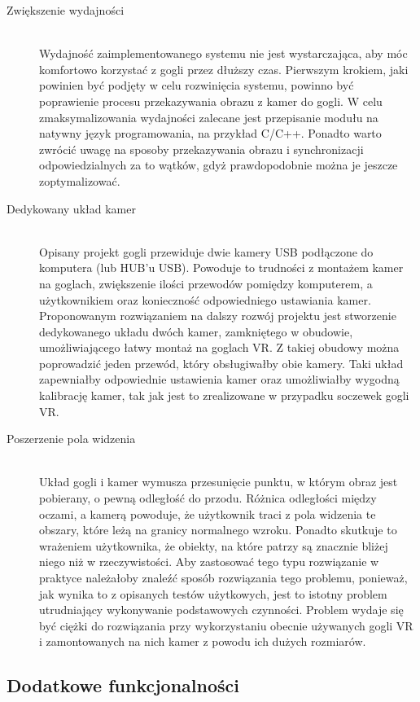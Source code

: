 \documentclass[a4paper,11pt,twoside]{report}
\theoremstyle{definition}
\begin{document}
\begin{description}
\item [Zwiększenie wydajności] \hfill \\
Wydajność zaimplementowanego systemu nie jest wystarczająca, aby móc komfortowo korzystać z gogli przez dłuższy czas. Pierwszym krokiem, jaki powinien być podjęty w celu rozwinięcia systemu, powinno być poprawienie procesu przekazywania obrazu z kamer do gogli. W celu zmaksymalizowania wydajności zalecane jest przepisanie modułu na natywny język programowania, na przykład C/C++. Ponadto warto zwrócić uwagę na sposoby przekazywania obrazu i synchronizacji odpowiedzialnych za to wątków, gdyż prawdopodobnie można je jeszcze zoptymalizować.

\item [Dedykowany układ kamer] \hfill \\
Opisany projekt gogli przewiduje dwie kamery USB podłączone do komputera (lub HUB'u USB). Powoduje to trudności z montażem kamer na goglach, zwiększenie ilości przewodów pomiędzy komputerem, a użytkownikiem oraz konieczność odpowiedniego ustawiania kamer. Proponowanym rozwiązaniem na dalszy rozwój projektu jest stworzenie dedykowanego układu dwóch kamer, zamkniętego w obudowie, umożliwiającego łatwy montaż na goglach VR. Z takiej obudowy można poprowadzić jeden przewód, który obsługiwałby obie kamery. Taki układ zapewniałby odpowiednie ustawienia kamer oraz umożliwiałby wygodną kalibrację kamer, tak jak jest to zrealizowane w przypadku soczewek gogli VR.

\item [Poszerzenie pola widzenia] \hfill \\
Układ gogli i kamer wymusza przesunięcie punktu, w którym obraz jest pobierany, o pewną odległość do przodu. Różnica odległości między oczami, a kamerą powoduje, że użytkownik traci z pola widzenia te obszary, które leżą na granicy normalnego wzroku. Ponadto skutkuje to wrażeniem użytkownika, że obiekty, na które patrzy są znacznie bliżej niego niż w rzeczywistości. Aby zastosować tego typu rozwiązanie w praktyce należałoby znaleźć sposób rozwiązania tego problemu, ponieważ, jak wynika to z opisanych testów użytkowych, jest to istotny problem utrudniający wykonywanie podstawowych czynności. Problem wydaje się być ciężki do rozwiązania przy wykorzystaniu obecnie używanych gogli VR i zamontowanych na nich kamer z powodu ich dużych rozmiarów.
\end{description}

\subsection{Dodatkowe funkcjonalności}
\end{document}
